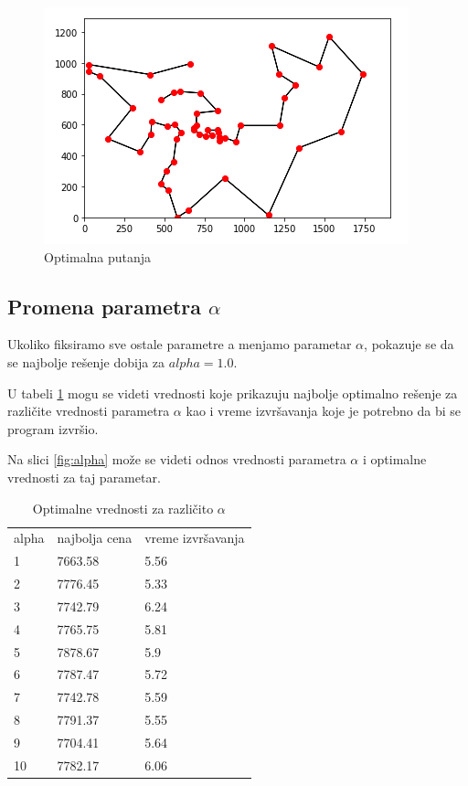 \documentclass[a4paper]{article}
\begin{document}
\begin{figure}[h!]
\begin{center}
\includegraphics[scale=0.7]{slika11.png}
\end{center}
\caption{Optimalna putanja}
\label{fig:slika11}
\end{figure}

\subsection{Promena parametra $\alpha$}

Ukoliko fiksiramo sve ostale parametre a menjamo parametar $\alpha$, pokazuje se da se najbolje rešenje dobija za $alpha = 1.0$.

U tabeli \ref{tab:alpha} mogu se videti vrednosti koje prikazuju najbolje optimalno rešenje za različite vrednosti parametra $\alpha$ kao i vreme izvršavanja koje je potrebno da bi se program izvršio.

Na slici \ref{fig:alpha} može se videti odnos vrednosti parametra $\alpha$ i optimalne vrednosti za taj parametar.

\hfill \break

\begin{table}[h]
\begin{center}
\begin{tabular}{ |p{2cm}|p{2cm}|p{2cm}|  }
\hline
\rowcolor{lightgray} \multicolumn{3}{|c|}{Promena parametra $\alpha$} \\
\hline
alpha & najbolja cena & vreme izvršavanja \\
\hline
\rowcolor{cyan}
1 & 7663.58 & 5.56 \\
2 & 7776.45 & 5.33 \\
3  &7742.79 & 6.24 \\
4  &7765.75 & 5.81 \\
5 & 7878.67 & 5.9 \\
6 & 7787.47 & 5.72  \\
7 & 7742.78 & 5.59 \\
8 & 7791.37 & 5.55 \\
9 & 7704.41 & 5.64 \\
10 & 7782.17 & 6.06 \\
\hline
\end{tabular}
\end{center}
\caption {Optimalne vrednosti za različito $\alpha$ \label{tab:alpha}}
\end{table}
\end{document}
